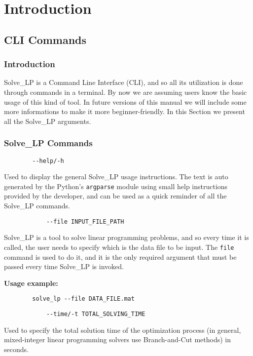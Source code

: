 \documentclass[12pt,hidelinks]{article}
\begin{document}
\section{Introduction}
\vspace{10.5cm}
	\subsection{CLI Commands}
	\subsubsection{Introduction}
	Solve\_LP is a Command Line Interface (CLI), and so all its utilization is done through commands in a terminal. By now we are assuming users know the basic usage of this kind of tool. In future versions of this manual we will include some more informations to make it more beginner-friendly. In this Section we present all the Solve\_LP arguments.

	\subsubsection{Solve\_LP Commands}
	{\color{mordantred19}
	\begin{verbatim}
		--help/-h
	\end{verbatim}
	} Used to display the general Solve\_LP usage instructions. The text is auto generated by the Python's \texttt{argparse} module using small help instructions provided by the developer, and can be used as a quick reminder of all the Solve\_LP commands.

	{\color{mordantred19}
		\begin{verbatim}
			--file INPUT_FILE_PATH
		\end{verbatim}
	} Solve\_LP is a tool to solve linear programming problems, and so every time it is called, the user needs to specify which is the data file to be input. The \texttt{file} command is used to do it, and it is the only required argument that must be passed every time Solve\_LP is invoked.

	\textbf{Usage example:} 
	\begin{verbatim}
		solve_lp --file DATA_FILE.mat
	\end{verbatim}

	{\color{mordantred19}
		\begin{verbatim}
			--time/-t TOTAL_SOLVING_TIME
		\end{verbatim}
	} Used to specify the total solution time of the optimization process (in general, mixed-integer linear programming solvers use Branch-and-Cut methods) in seconds.
	
\end{document}
